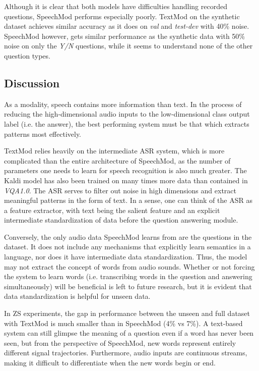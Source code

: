 \documentclass[letterpaper]{article} %
\begin{document}
Although it is clear that both models have difficulties handling recorded questions, SpeechMod performs especially poorly. TextMod on the synthetic dataset achieves similar accuracy as it does on \textit{val} and \textit{test-dev} with 40\% noise. SpeechMod however, gets similar performance as the synthetic data with 50\% noise on only the \textit{Y/N} questions, while it seems to understand none of the other question types.


\subsection{Discussion}

As a modality, speech contains more information than text. In the process of reducing the high-dimensional audio inputs to the low-dimensional class output label (i.e. the answer), the best performing system must be that which extracts patterns most effectively.

TextMod relies heavily on the intermediate ASR system, which is more complicated than the entire architecture of SpeechMod, as the number of parameters one needs to learn for speech recognition is also much greater. The Kaldi model has also been trained on many times more data than contained in \textit{VQA1.0}. The ASR serves to filter out noise in high dimensions and extract meaningful patterns in the form of text. In a sense, one can think of the ASR as a feature extractor, with text being the salient feature and an explicit intermediate standardization of data before the question answering module.

Conversely, the only audio data SpeechMod learns from are the questions in the dataset. It does not include any mechanisms that explicitly learn semantics in a language, nor does it have intermediate data standardization. Thus, the model may not extract the concept of words from audio sounds. Whether or not forcing the system to learn words (i.e. transcribing words in the question and answering simultaneously) will be beneficial is left to future research, but it is evident that data standardization is helpful for unseen data.

In ZS experiments, the gap in performance between the unseen and full dataset with TextMod is much smaller than in SpeechMod (4\% vs 7\%). A text-based system can still glimpse the meaning of a question even if a word has never been seen, but from the perspective of SpeechMod, new words represent entirely different signal trajectories. Furthermore, audio inputs are continuous streams, making it difficult to differentiate when the new words begin or end. 
\end{document}
